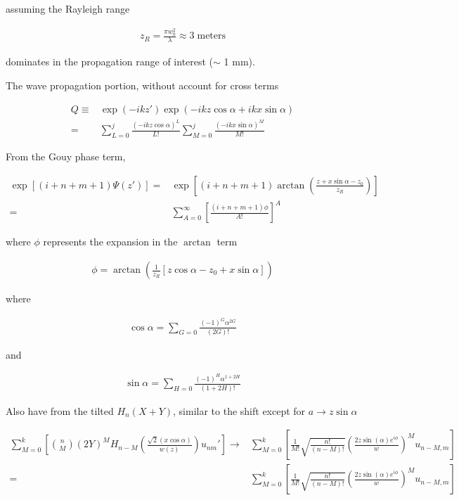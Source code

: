 \documentclass[aps,twoside,secnumarabic,balancelastpage,amsmath,amssymb,nofootinbib,hyperref=pdftex]{revtex4}
\begin{document}
assuming the Rayleigh range 

\begin{align*}
	z_R = \frac{\pi w_0^2}{\lambda} \approx 3 \; \mathrm{meters}
\end{align*}

dominates in the propagation range of interest ($\sim$ 1 mm).

The wave propagation portion, without account for cross terms

\begin{align*}
Q \equiv &
	\exp(-ikz')
	\exp(-ikz \cos \alpha +ik x \sin \alpha ) 
	\\=&
	\sum_{L=0}^j
	\frac{(-ik z \cos \alpha )^L}{L!}
	\sum_{M=0}^j
	\frac{(-ik x \sin \alpha )^M}{M!}
\end{align*}


From the Gouy phase term,

\begin{align*}
	\exp[ (i+n+m+1)\Psi(z')] =&
		\exp[(i+n+m+1)
		\arctan(\frac{z+x\sin\alpha-z_0}{z_R})]
		\\ = &
		\sum_{A=0}^\infty
		[\frac{ (i+n+m+1)
		\phi }{A!}]^A
\end{align*}

where $\phi$ represents the expansion in the $\arctan$ term

\begin{align*}
\phi = 
	\arctan( \frac{1}{z_R} [ 
	z \cos \alpha
	-z_0 
	+x 
	\sin \alpha
	] )
\end{align*}

where

\begin{align*}
	\cos \alpha = \sum_{G = 0} \frac{(-1)^G \alpha^{2G}}{(2G)!}
\end{align*}


and

\begin{align*}
	\sin \alpha = \sum_{H = 0} \frac{(-1)^H \alpha^{1+2H}}{(1+2H)!}
\end{align*}

Also have from the tilted $H_n(X+Y)$, similar to the shift except for $a \rightarrow z \sin \alpha$

\begin{align*}
\sum_{M=0}^k
\left[
{n \choose M}
(2Y)^M
H_{n-M}( \frac{\sqrt{2}(x\cos\alpha)}{w(z)}) u_{nm}' 
\right]
	\rightarrow & 
			\sum_{M=0}^k
		[
		\frac{1}{M!}
		\sqrt{\frac{n!}{(n-M)!}}
		(
		 \frac{2 z\sin (\alpha) e^{i\phi}}{w}
		)^M
		u_{n-M,m}
		]
		\\=&
					\sum_{M=0}^k
		[
		\frac{1}{M!}
		\sqrt{\frac{n!}{(n-M)!}}
		(
		 \frac{2 z\sin (\alpha) e^{i\phi}}{w}
		)^M
		u_{n-M,m}
		]		
\end{align*}
\end{document}
